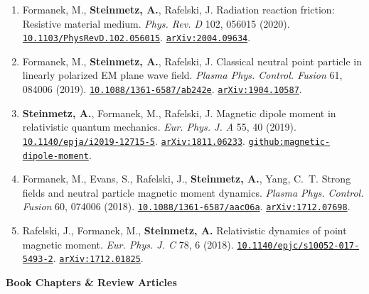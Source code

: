 \documentclass[11pt]{article}
\begin{document}
\begin{enumerate}[leftmargin=*,nosep]
    \item Formanek, M., \textbf{Steinmetz, A.}, Rafelski, J. Radiation reaction friction: Resistive material medium. \textit{Phys. Rev. D} 102, 056015 (2020). \href{https://doi.org/10.1103/PhysRevD.102.056015}{\nolinkurl{10.1103/PhysRevD.102.056015}}. \href{https://arxiv.org/abs/2004.09634}{\nolinkurl{arXiv:2004.09634}}.
    \item Formanek, M., \textbf{Steinmetz, A.}, Rafelski, J. Classical neutral point particle in linearly polarized EM plane wave field. \textit{Plasma Phys. Control. Fusion} 61, 084006 (2019). \href{https://doi.org/10.1088/1361-6587/ab242e}{\nolinkurl{10.1088/1361-6587/ab242e}}. \href{https://arxiv.org/abs/1904.10587}{\nolinkurl{arXiv:1904.10587}}.
    \item \textbf{Steinmetz, A.}, Formanek, M., Rafelski, J. Magnetic dipole moment in relativistic quantum mechanics. \textit{Eur. Phys. J. A} 55, 40 (2019). \href{https://doi.org/10.1140/epja/i2019-12715-5}{\nolinkurl{10.1140/epja/i2019-12715-5}}. \href{https://arxiv.org/abs/1811.06233}{\nolinkurl{arXiv:1811.06233}}. \href{https://github.com/ajsteinmetz/magnetic-dipole-moment}{\nolinkurl{github:magnetic-dipole-moment}}.
    \item Formanek, M., Evans, S., Rafelski, J., \textbf{Steinmetz, A.}, Yang, C.~T. Strong fields and neutral particle magnetic moment dynamics. \textit{Plasma Phys. Control. Fusion} 60, 074006 (2018). \href{https://doi.org/10.1088/1361-6587/aac06a}{\nolinkurl{10.1088/1361-6587/aac06a}}. \href{https://arxiv.org/abs/1712.07698}{\nolinkurl{arXiv:1712.07698}}.
    \item Rafelski, J., Formanek, M., \textbf{Steinmetz, A.} Relativistic dynamics of point magnetic moment. \textit{Eur. Phys. J. C} 78, 6 (2018). \href{https://doi.org/10.1140/epjc/s10052-017-5493-2}{\nolinkurl{10.1140/epjc/s10052-017-5493-2}}. \href{https://arxiv.org/abs/1712.01825}{\nolinkurl{arXiv:1712.01825}}.
\end{enumerate}

\medskip

{\large\textbf{Book Chapters \& Review Articles}}
\end{document}

